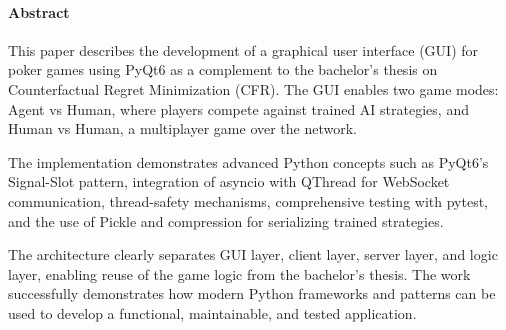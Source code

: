 \paragraph{Abstract}

This paper describes the development of a graphical user interface (GUI) for poker games using PyQt6 as a complement to the bachelor's thesis on Counterfactual Regret Minimization (CFR).
The GUI enables two game modes: Agent vs Human, where players compete against trained AI strategies, and Human vs Human, a multiplayer game over the network.

The implementation demonstrates advanced Python concepts such as PyQt6's Signal-Slot pattern, integration of asyncio with QThread for WebSocket communication, thread-safety mechanisms, comprehensive testing with pytest, and the use of Pickle and compression for serializing trained strategies.

The architecture clearly separates GUI layer, client layer, server layer, and logic layer, enabling reuse of the game logic from the bachelor's thesis.
The work successfully demonstrates how modern Python frameworks and patterns can be used to develop a functional, maintainable, and tested application.
